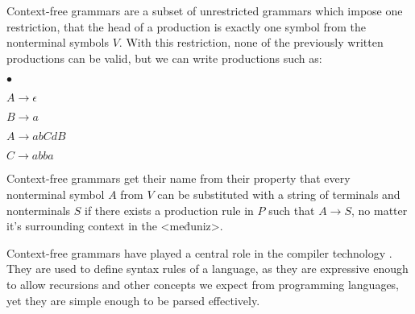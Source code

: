 Context-free grammars are a subset of unrestricted grammars which impose one restriction, that the head of a production is exactly one symbol from the nonterminal symbols $V$. With this restriction, none of the previously written productions can be valid, but we can write productions such as:
\begin{list}{$\bullet$}{}  	
	\item $A \rightarrow \epsilon$
	\item $B \rightarrow a$
	\item $A \rightarrow abCdB$
	\item $C \rightarrow abba$
\end{list}

Context-free grammars get their name from their property that every nonterminal symbol $A$ from $V$ can be substituted with a string of terminals and nonterminals $S$ if there exists a production rule in $P$ such that $A \rightarrow S$, no matter it's surrounding context in the <međuniz>.

Context-free grammars have played a central role in the compiler technology \citep{hopcroft2007automatatheory}. They are used to define syntax rules of a language, as they are expressive enough to allow recursions and other concepts we expect from programming languages, yet they are simple enough to be parsed effectively.